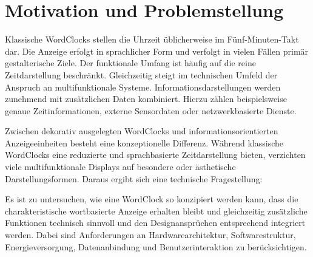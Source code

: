 \section{Motivation und Problemstellung}
Klassische WordClocks stellen die Uhrzeit üblicherweise im Fünf-Minuten-Takt dar. 
Die Anzeige erfolgt in sprachlicher Form und verfolgt in vielen Fällen primär gestalterische Ziele. 
Der funktionale Umfang ist häufig auf die reine Zeitdarstellung beschränkt. 
Gleichzeitig steigt im technischen Umfeld der Anspruch an multifunktionale Systeme. 
Informationsdarstellungen werden zunehmend mit zusätzlichen Daten kombiniert. 
Hierzu zählen beispielsweise genaue Zeitinformationen, externe Sensordaten oder netzwerkbasierte Dienste. 

Zwischen dekorativ ausgelegten WordClocks und informationsorientierten Anzeigeeinheiten besteht eine konzeptionelle Differenz. 
Während klassische WordClocks eine reduzierte und sprachbasierte Zeitdarstellung bieten, verzichten viele multifunktionale Displays auf besondere oder ästhetische Darstellungsformen. 
Daraus ergibt sich eine technische Fragestellung: 

Es ist zu untersuchen, wie eine WordClock so konzipiert werden kann, dass die charakteristische wortbasierte Anzeige erhalten bleibt und gleichzeitig zusätzliche Funktionen technisch sinnvoll und den Designansprüchen entsprechend integriert werden. 
Dabei sind Anforderungen an Hardwarearchitektur, Softwarestruktur, Energieversorgung, Datenanbindung und Benutzerinteraktion zu berücksichtigen. 